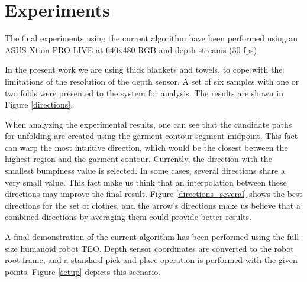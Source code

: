 \section{Experiments}
\label{experiments:experiments}

The final experiments using the current algorithm have been performed using an ASUS Xtion PRO LIVE at 640x480 RGB and depth streams (30 fps).

In the present work we are using thick blankets and towels, to cope with the limitations of the resolution of the depth sensor. A set of six samples with one or two folds were presented to the system for analysis. The results are shown in Figure \ref{directions}.

When analyzing the experimental results, one can see that the candidate paths for unfolding are created using the garment contour segment midpoint. This fact can warp the most intuitive direction, which would be the closest between the highest region and the garment contour. Currently, the direction with the smallest bumpiness value is selected. In some cases, several directions share a very small value. This fact make us think that an interpolation between these directions may improve the final result. Figure \ref{directions_several} shows the best directions for the set of clothes, and the arrow's directions make us believe that a combined directions by averaging them could provide better results.

A final demonstration of the current algorithm has been performed using the full-size humanoid robot TEO. Depth sensor coordinates are converted to the robot root frame, and a standard pick and place operation is performed with the given points. Figure \ref{setup} depicts this scenario.


